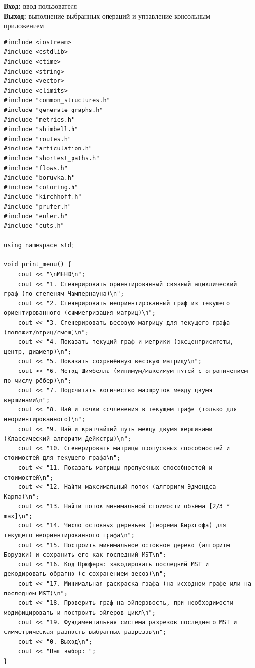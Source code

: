 \noindent\textbf{Вход:}
ввод пользователя \\
\noindent\textbf{Выход:}
выполнение выбранных операций и управление консольным приложением

\begin{lstlisting}[caption=main.cpp]
#include <iostream>
#include <cstdlib>
#include <ctime>
#include <string>
#include <vector>
#include <climits>
#include "common_structures.h"
#include "generate_graphs.h"
#include "metrics.h"
#include "shimbell.h"
#include "routes.h"
#include "articulation.h"
#include "shortest_paths.h"
#include "flows.h"
#include "boruvka.h"
#include "coloring.h"
#include "kirchhoff.h"
#include "prufer.h"
#include "euler.h"
#include "cuts.h"

using namespace std;

void print_menu() {
	cout << "\nМЕНЮ\n";
	cout << "1. Сгенерировать ориентированный связный ациклический граф (по степеням Чампернауна)\n";
	cout << "2. Сгенерировать неориентированный граф из текущего ориентированного (симметризация матриц)\n";
	cout << "3. Сгенерировать весовую матрицу для текущего графа (положит/отриц/смеш)\n";
	cout << "4. Показать текущий граф и метрики (эксцентриситеты, центр, диаметр)\n";
	cout << "5. Показать сохранённую весовую матрицу\n";
	cout << "6. Метод Шимбелла (минимум/максимум путей с ограничением по числу рёбер)\n";
	cout << "7. Подсчитать количество маршрутов между двумя вершинами\n";
	cout << "8. Найти точки сочленения в текущем графе (только для неориентированного)\n";
	cout << "9. Найти кратчайший путь между двумя вершинами (Классический алгоритм Дейкстры)\n";
	cout << "10. Сгенерировать матрицы пропускных способностей и стоимостей для текущего графа\n";
	cout << "11. Показать матрицы пропускных способностей и стоимостей\n";
	cout << "12. Найти максимальный поток (алгоритм Эдмондса-Карпа)\n";
	cout << "13. Найти поток минимальной стоимости объёма [2/3 * max]\n";
	cout << "14. Число остовных деревьев (теорема Кирхгофа) для текущего неориентированного графа\n";
	cout << "15. Построить минимальное остовное дерево (алгоритм Борувки) и сохранить его как последний MST\n";
	cout << "16. Код Прюфера: закодировать последний MST и декодировать обратно (с сохранением весов)\n";
	cout << "17. Минимальная раскраска графа (на исходном графе или на последнем MST)\n";
	cout << "18. Проверить граф на эйлеровость, при необходимости модифицировать и построить эйлеров цикл\n";
	cout << "19. Фундаментальная система разрезов последнего MST и симметрическая разность выбранных разрезов\n";
	cout << "0. Выход\n";
	cout << "Ваш выбор: ";
}


\end{lstlisting}
